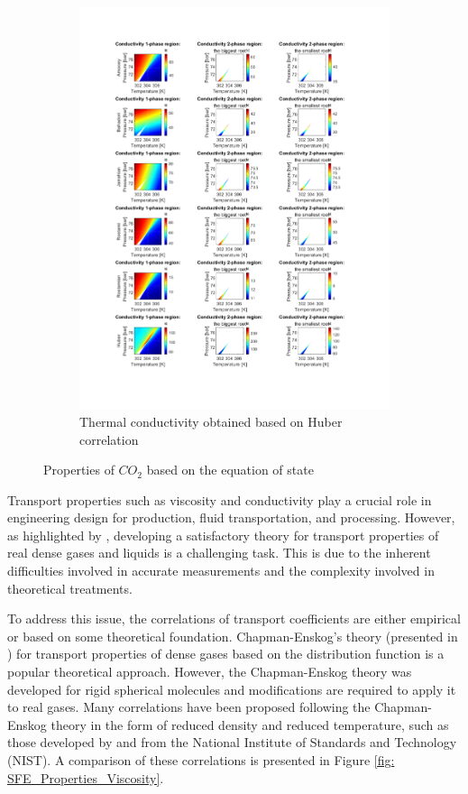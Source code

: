 \documentclass[../Article_Model_Parameters.tex]{subfiles}
\begin{document}
\begin{figure}[H]
\begin{subfigure}[b]{0.31\textwidth}
			\includegraphics[trim = 2.5cm 2.8cm 14.3cm 21.4cm,clip,width=\textwidth]{Figures/KT.pdf}	
			\caption{Thermal conductivity obtained based on Huber correlation}
			\label{fig: SFE_Properties_Thermal}
		\end{subfigure}
		\caption{Properties of $CO_2$ based on the equation of state}
		\label{fig: SFE_Properties}
	\end{figure}    
	
	Transport properties such as viscosity and conductivity play a crucial role in engineering design for production, fluid transportation, and processing. However, as highlighted by \citet{Sheng1989}, developing a satisfactory theory for transport properties of real dense gases and liquids is a challenging task. This is due to the inherent difficulties involved in accurate measurements and the complexity involved in theoretical treatments.
	
	To address this issue, the correlations of transport coefficients are either empirical or based on some theoretical foundation. Chapman-Enskog's theory (presented in \citet{Chapman1991}) for transport properties of dense gases based on the distribution function is a popular theoretical approach. However, the Chapman-Enskog theory was developed for rigid spherical molecules and modifications are required to apply it to real gases. Many correlations have been proposed following the Chapman-Enskog theory in the form of reduced density and reduced temperature, such as those developed by \citet{Fenghour1998} and \citet{Laesecke2017} from the National Institute of Standards and Technology (NIST). A comparison of these correlations is presented in Figure \ref{fig: SFE_Properties_Viscosity}.
	
\end{document}
